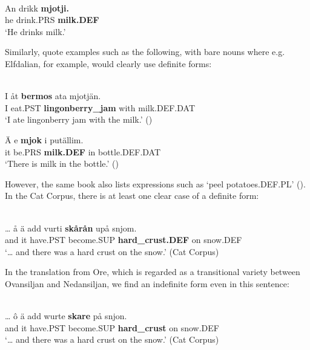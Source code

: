 \ea \label{} 
\\
\gll An  drikk  \textbf{mjotji.}\\
he  drink.PRS  \textbf{milk.DEF}\\
\glt ‘He drinks milk.’ 

\z

Similarly, \citet{AnderssonEtAl1999} quote examples such as the following, with bare nouns where e.g. Elfdalian, for example, would clearly use definite forms:

\ea\label{}
\\
\gll I  åt  \textbf{bermos} ata  mjotjän.\\
I  eat.PST  \textbf{lingonberry\_jam} with  milk.DEF.DAT\\
\glt ‘I ate lingonberry jam with the milk.’ (\citet[373]{AnderssonEtAl1999})

\z

\ea
\gll Ä  e  \textbf{mjok} i  putällim.\\
it  be.PRS  \textbf{milk.DEF} in  bottle.DEF.DAT\\
\glt ‘There is milk in the bottle.’ (\citet[373]{AnderssonEtAl1999})

\z

However, the same book also lists expressions such as  ‘peel potatoes.DEF.PL’ (\citet[176]{AnderssonEtAl1999}). In the Cat Corpus, there is at least one clear case of a definite form:

\ea \label{} 
\\
\gll …  å  ä  add  vurti  \textbf{skårån} upå  snjom.\\
  and  it  have.PST  become.SUP  \textbf{hard\_crust.DEF} on  snow.DEF\\
\glt ‘… and there was a hard crust on the snow.’ (Cat Corpus)

\z

In the translation from Ore, which is regarded as a transitional variety between Ovansiljan and Nedansiljan, we find an indefinite form even in this sentence:

\ea \label{} 
\\
\gll …  ô  ä  add  wurte  \textbf{skare} på  snjon.\\
  and  it  have.PST  become.SUP  \textbf{hard\_crust} on  snow.DEF\\
\glt ‘… and there was a hard crust on the snow.’ (Cat Corpus)

